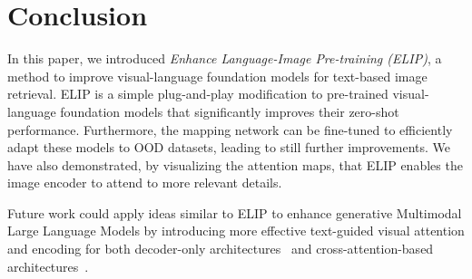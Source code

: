 \section{Conclusion}
\label{sec:conclusion}

In this paper, we introduced {\em Enhance Language-Image Pre-training (ELIP)}, a method to improve visual-language foundation models for text-based image retrieval. ELIP is a simple plug-and-play modification to pre-trained visual-language foundation models that significantly improves their zero-shot performance. Furthermore, the mapping network can be fine-tuned to
efficiently adapt these models to OOD datasets, leading to still further improvements. We have also demonstrated, by visualizing the attention maps, that ELIP enables the image encoder to attend to more relevant details.

Future work could apply ideas similar to ELIP to enhance generative Multimodal Large Language Models by introducing more effective text-guided visual attention and encoding for both decoder-only architectures~\cite{liu2023visual} and cross-attention-based architectures~\cite{alayrac2022flamingo}. 
